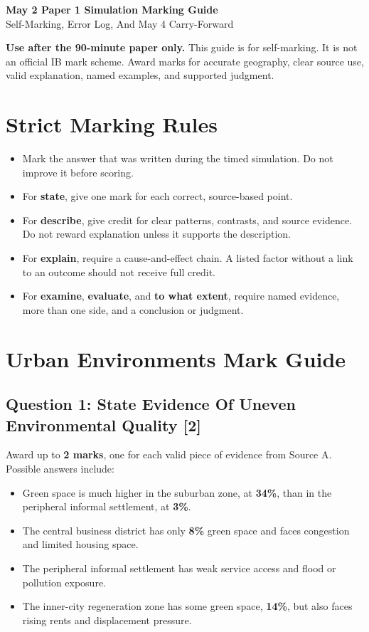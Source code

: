 \documentclass[11pt,a4paper]{article}
\newcommand{\term}[1]{\textcolor{HeadingBlue}{\textbf{#1}}}
\newcommand{\exam}[1]{\textcolor{AccentTeal}{\textbf{#1}}}
\newcommand{\boxnote}[3]{%
\noindent\colorbox{#1}{%
  \begin{minipage}{0.965\textwidth}
  \sffamily
  \textbf{\textcolor{HeadingBlue}{#2}} #3
  \end{minipage}
}}
\begin{document}
\begin{center}
  {\sffamily\bfseries\color{HeadingBlue}\LARGE May 2 Paper 1 Simulation Marking Guide}\\[0.25em]
  {\sffamily\color{AccentTeal}\large Self-Marking, Error Log, And May 4 Carry-Forward}
\end{center}

\boxnote{SoftRed}{Use after the 90-minute paper only.}{This guide is for
self-marking. It is not an official IB mark scheme. Award marks for accurate
geography, clear source use, valid explanation, named examples, and supported
judgment.}

\section{Strict Marking Rules}

\begin{itemize}
  \item Mark the answer that was written during the timed simulation. Do not
  improve it before scoring.
  \item For \exam{state}, give one mark for each correct, source-based point.
  \item For \exam{describe}, give credit for clear patterns, contrasts, and
  source evidence. Do not reward explanation unless it supports the description.
  \item For \exam{explain}, require a cause-and-effect chain. A listed factor
  without a link to an outcome should not receive full credit.
  \item For \exam{examine}, \exam{evaluate}, and \exam{to what extent}, require
  named evidence, more than one side, and a conclusion or judgment.
\end{itemize}

\section{Urban Environments Mark Guide}

\subsection{Question 1: State Evidence Of Uneven Environmental Quality [2]}

Award up to \term{2 marks}, one for each valid piece of evidence from Source A.
Possible answers include:

\begin{itemize}
  \item Green space is much higher in the suburban zone, at \term{34\%}, than in
  the peripheral informal settlement, at \term{3\%}.
  \item The central business district has only \term{8\%} green space and faces
  congestion and limited housing space.
  \item The peripheral informal settlement has weak service access and flood or
  pollution exposure.
  \item The inner-city regeneration zone has some green space, \term{14\%}, but
  also faces rising rents and displacement pressure.
\end{itemize}
\end{document}
